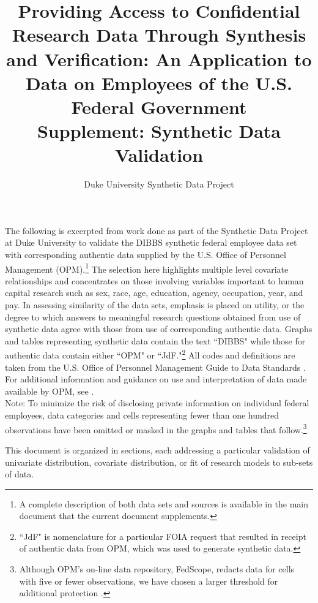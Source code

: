 \documentclass[10pt, letterpaper]{article}
\title{\LARGE Providing Access to Confidential Research Data Through Synthesis and Verification: An Application to Data on Employees of the U.S. Federal Government\\
\vspace{12pt} \Large Supplement:  Synthetic Data Validation}
\author{Duke University Synthetic Data Project}
\begin{document}
\begin{spacing}{1.0}

\maketitle

\vspace{20pt}

The following is excerpted from work done as part of the Synthetic Data Project at Duke University to validate the DIBBS synthetic federal employee data set with corresponding authentic data supplied by the U.S. Office of Personnel Management (OPM).\footnote{A complete description of both data sets and sources is available in the main document that the current document supplements.}  The selection here highlights multiple level covariate relationships and concentrates on those involving variables important to human capital research such as sex, race, age, education, agency, occupation, year, and pay.  In assessing similarity of the data sets, emphasis is placed on utility, or the degree to which answers to meaningful research questions obtained from use of synthetic data agree with those from use of corresponding authentic data.  Graphs and tables representing synthetic data contain the text ``DIBBS" while those for authentic data contain either ``OPM" or ``JdF."\footnote{``JdF" is nomenclature for a particular FOIA request that resulted in receipt of authentic data from OPM, which was used to generate synthetic data.}  All codes and definitions are taken from the U.S. Office of Personnel Management Guide to Data Standards \citep{OPMGDS}.  For additional information and guidance on use and interpretation of data made available by OPM, see \citep{OPMDataAnalysis}.\\

Note:  To minimize the risk of disclosing private information on individual federal employees, data categories and cells representing fewer than one hundred observations have been omitted or masked in the graphs and tables that follow.\footnote{Although OPM's on-line data repository, FedScope, redacts data for cells with five or fewer observations, we have chosen a larger threshold for additional protection \citep{OPMFedScope}.}\\

\clearpage

This document is organized in sections, each addressing a particular validation of univariate distribution, covariate distribution, or fit of research models to sub-sets of data.


\end{spacing}
\end{document}
